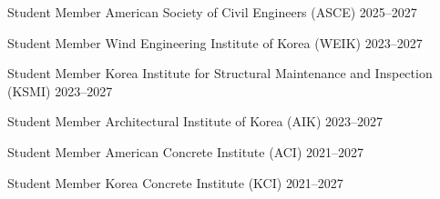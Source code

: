 

\begin{cvhonors}

  \cvhonor
    {Student Member} %
    {American Society of Civil Engineers (ASCE)} %
    {} %
    {2025--2027} %

  \cvhonor
    {Student Member} %
    {Wind Engineering Institute of Korea (WEIK)} %
    {} %
    {2023--2027} %

  \cvhonor
    {Student Member} %
    {Korea Institute for Structural Maintenance and Inspection (KSMI)} %
    {} %
    {2023--2027} %

  \cvhonor
    {Student Member} %
    {Architectural Institute of Korea (AIK)} %
    {} %
    {2023--2027} %

  \cvhonor
    {Student Member} %
    {American Concrete Institute (ACI)} %
    {} %
    {2021--2027} %

  \cvhonor
    {Student Member} %
    {Korea Concrete Institute (KCI)} %
    {} %
    {2021--2027} %

\end{cvhonors}
